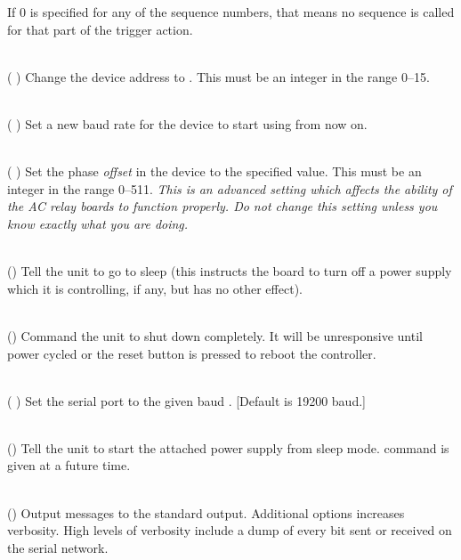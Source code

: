 \begin{list}{}{}
If 0 is specified for any of the sequence numbers, that means no
sequence is called for that part of the trigger action.
\item[{\codetype{----set--address=}\Var*{addr}}]\hfill\\
(
)
Change the device address to
.
This must be an integer in the range 0--15.
\item[{\codetype{----set--baud--rate=}\Var*{speed}}]\hfill\\
(
)
Set a new baud rate for the device to start using from now on.
\item[{\codetype{----set--phase=}\Var*{offset}}]\hfill\\
(
)
Set the phase 
\emph{offset}
in the device to the specified value.  This must be an integer in the range 0--511.
\emph{This is an advanced setting which affects the ability of the AC relay boards to}
\emph{function properly. Do not change this setting unless you know exactly what you are doing.}
\item[{\codetype{----sleep}}]\hfill\\
()
Tell the unit to go to sleep (this instructs the board to turn off a
power supply which it is controlling, if any, but has no other effect).
\item[{\codetype{----shutdown}}]\hfill\\
()
Command the unit to shut down completely.  It will be unresponsive until
power cycled or the reset button is pressed to reboot the controller.
\item[{\codetype{----speed=}\Var*{rate}}]\hfill\\
(
)
Set the serial port to the given
baud
.
[Default is 19200 baud.]
\item[{\codetype{----wake}}]\hfill\\
()
Tell the unit to start the attached power supply from sleep mode.
command is given at a future time.
\item[{\codetype{----verbose}}]\hfill\\
()
Output messages to the standard output.  Additional 
options increases verbosity.  High levels of verbosity include a dump
of every bit sent or received on the serial network.
\end{list}
